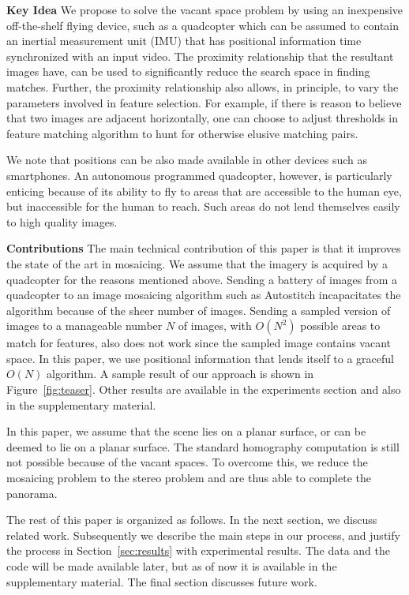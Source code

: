 \documentclass[10pt,twocolumn,letterpaper]{article}
\begin{document}
{\bf Key Idea} We propose to solve the vacant space problem by using
an inexpensive off-the-shelf flying device, such as a quadcopter which
can be assumed to contain an inertial measurement unit (IMU) that has
positional information time synchronized with an input video.  The
proximity relationship that the resultant images have, can be used to
significantly reduce the search space in finding matches.  Further,
the proximity relationship also allows, in principle, to vary the
parameters involved in feature selection. For example, if there is
reason to believe that two images are adjacent horizontally, one can
choose to adjust thresholds in feature matching algorithm to hunt for
otherwise elusive matching pairs.

We note that positions can be also made available in other devices
such as smartphones.  An autonomous programmed quadcopter, however, is
particularly enticing because of its ability to fly to areas that are
accessible to the human eye, but inaccessible for the
human to reach.  Such areas do not lend themselves easily to high
quality images.


{\bf Contributions} The main technical contribution of this paper is
that it improves the state of the art in mosaicing.  We assume that
the imagery is acquired by a quadcopter for the reasons mentioned
above. Sending a battery of images from a quadcopter to an image
mosaicing algorithm such as Autostitch
incapacitates the algorithm because of the sheer number of
images. Sending a sampled version of images to a manageable number $N$
of images, with $O(N^2)$ possible areas to match for features, also
does not work since the sampled image contains vacant space.  In this
paper, we use positional information that lends itself to a graceful
$O(N)$ algorithm.  A sample result of our approach is shown in
Figure~\ref{fig:teaser}.  Other results are available in the
experiments section and also in the supplementary material.

In this paper, we assume that the
scene lies on a planar surface, or can be deemed to lie on a planar surface. The
standard homography computation is still not possible because of the
vacant spaces. To overcome this, we reduce the mosaicing problem to
the stereo problem and are thus able to complete the panorama.

The rest of this paper is organized as follows.  In the next section,
we discuss related work.  Subsequently we describe the main steps in
our process, and justify the process in Section~\ref{sec:results} with
experimental results.  The data and the code will be made available
later, but as of now it is available in the supplementary material.
The final section discusses future work.
\end{document}
